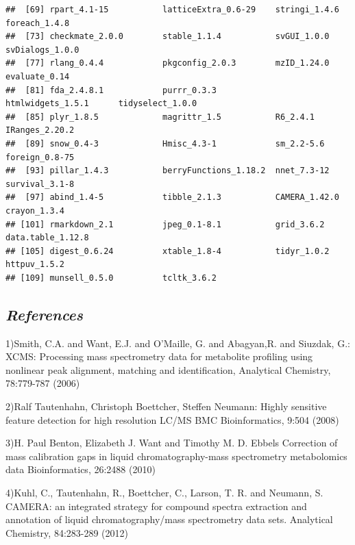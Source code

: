 \documentclass[
]{article}
\begin{document}
\begin{verbatim}
##  [69] rpart_4.1-15           latticeExtra_0.6-29    stringi_1.4.6          foreach_1.4.8         
##  [73] checkmate_2.0.0        stable_1.1.4           svGUI_1.0.0            svDialogs_1.0.0       
##  [77] rlang_0.4.4            pkgconfig_2.0.3        mzID_1.24.0            evaluate_0.14         
##  [81] fda_2.4.8.1            purrr_0.3.3            htmlwidgets_1.5.1      tidyselect_1.0.0      
##  [85] plyr_1.8.5             magrittr_1.5           R6_2.4.1               IRanges_2.20.2        
##  [89] snow_0.4-3             Hmisc_4.3-1            sm_2.2-5.6             foreign_0.8-75        
##  [93] pillar_1.4.3           berryFunctions_1.18.2  nnet_7.3-12            survival_3.1-8        
##  [97] abind_1.4-5            tibble_2.1.3           CAMERA_1.42.0          crayon_1.3.4          
## [101] rmarkdown_2.1          jpeg_0.1-8.1           grid_3.6.2             data.table_1.12.8     
## [105] digest_0.6.24          xtable_1.8-4           tidyr_1.0.2            httpuv_1.5.2          
## [109] munsell_0.5.0          tcltk_3.6.2
\end{verbatim}

\hypertarget{references}{%
\subsection{\texorpdfstring{\emph{References}}{References}}\label{references}}

1)Smith, C.A. and Want, E.J. and O'Maille, G. and Abagyan,R. and
Siuzdak, G.: XCMS: Processing mass spectrometry data for metabolite
profiling using nonlinear peak alignment, matching and identification,
Analytical Chemistry, 78:779-787 (2006)

2)Ralf Tautenhahn, Christoph Boettcher, Steffen Neumann: Highly
sensitive feature detection for high resolution LC/MS BMC
Bioinformatics, 9:504 (2008)

3)H. Paul Benton, Elizabeth J. Want and Timothy M. D. Ebbels Correction
of mass calibration gaps in liquid chromatography-mass spectrometry
metabolomics data Bioinformatics, 26:2488 (2010)

4)Kuhl, C., Tautenhahn, R., Boettcher, C., Larson, T. R. and Neumann, S.
CAMERA: an integrated strategy for compound spectra extraction and
annotation of liquid chromatography/mass spectrometry data sets.
Analytical Chemistry, 84:283-289 (2012)
\end{document}
